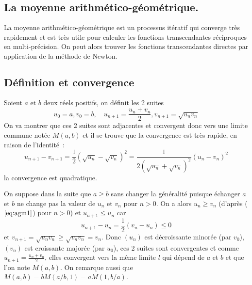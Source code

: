 \documentclass[a4paper,11pt]{article}
\begin{document}
\begin{giacjshere}
\section{La moyenne arithm\'etico-g\'eom\'etrique.}
\label{sec:agm}
La moyenne arithm\'etico-g\'eom\'etrique est un processus it\'eratif
qui converge tr\`es rapidement et est tr\`es utile pour calculer
les fonctions transcendantes r\'eciproques en multi-pr\'ecision. 
On peut alors trouver les fonctions transcendantes directes
par application de la m\'ethode de Newton.

\subsection{D\'efinition et convergence}
Soient $a$ et $b$ deux r\'eels positifs,
on d\'efinit les 2 suites 
\begin{equation} \label{eq:agm}
 u_0=a, v_0=b, \quad u_{n+1}=\frac{u_n+v_n}{2}, v_{n+1}=\sqrt{u_nv_n} 
\end{equation}
On va montrer que ces 2 suites sont adjacentes et convergent donc vers
une limite commune not\'ee $M(a,b)$ et il se trouve que la convergence
est tr\`es rapide, en raison de l'identit\'e~:
\begin{equation} \label{eq:agm1}
u_{n+1}-v_{n+1}=\frac{1}{2}(\sqrt{u_n}-\sqrt{v_n})^2
=\frac{1}{2(\sqrt{u_n}+\sqrt{v_n})^2}(u_n-v_n)^2
\end{equation}
la convergence est quadratique.

On suppose dans la suite que $a\geq b$ sans changer la généralité puisque échanger $a$ et $b$
ne change pas la valeur de $u_n$ et $v_n$ pour $n>0$. On a alors $u_n \geq v_n$ 
(d'après (\(\ref{eq:agm1}\)) pour $n>0$) et $u_{n+1} \leq u_n$ car
\[ u_{n+1}-u_n=\frac{1}{2}(v_n-u_{n}) \leq 0\]
et $v_{n+1}=\sqrt{u_nv_n} \geq \sqrt{v_nv_n}=v_n$. Donc $(u_n)$ est décroissante 
minorée (par $v_0$), $(v_n)$ est croissante majorée (par $u_0$), ces 2 suites sont 
convergentes et comme $u_{n+1}=\frac{u_n+v_n}{2}$, elles convergent vers la même limite 
$l$ qui d\'epend de $a$ et $b$ et que l'on note $M(a,b)$.
On remarque aussi que $M(a,b)=bM(a/b,1)=aM(1,b/a)$. 


\end{giacjshere}
\end{document}
